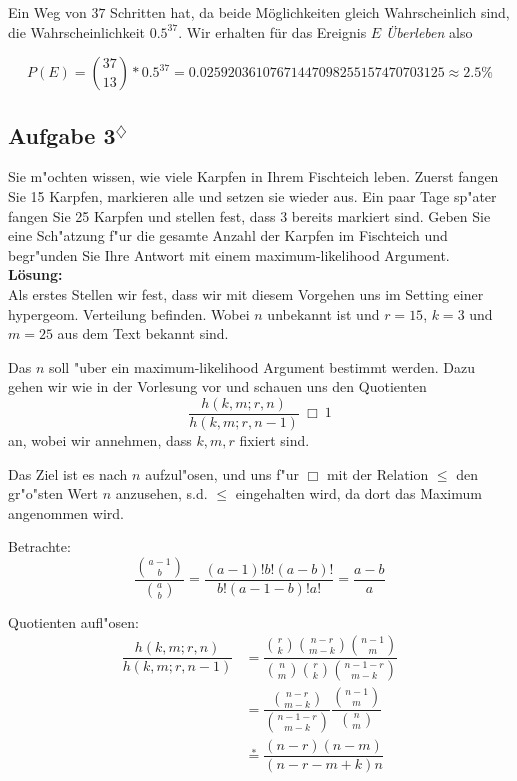 \documentclass[11pt,a4paper,ngerman]{article}
\newcommand{\marcel}{$^\diamondsuit$}
\begin{document}
Ein Weg von $37$ Schritten hat, da beide Möglichkeiten gleich Wahrscheinlich sind, die Wahrscheinlichkeit $0.5^{37}$. Wir erhalten für
das Ereignis $E$ \emph{Überleben} also

\[
    P(E) = \binom{37}{13} * 0.5^{37} = 0.02592036107671447098255157470703125 \approx 2.5\%
\]

\subsection*{Aufgabe 3\marcel}

Sie m"ochten wissen, wie viele Karpfen in Ihrem Fischteich leben. Zuerst fangen
Sie 15 Karpfen, markieren alle und setzen sie wieder aus. Ein paar Tage sp"ater
fangen Sie 25 Karpfen und stellen fest, dass 3 bereits markiert sind. Geben Sie
eine Sch"atzung f"ur die gesamte Anzahl der Karpfen im Fischteich und begr"unden
Sie Ihre Antwort mit einem maximum-likelihood Argument. \\

\textbf{Lösung:}\\

Als erstes Stellen wir fest, dass wir mit diesem Vorgehen uns im Setting einer
hypergeom. Verteilung befinden. Wobei $n$ unbekannt ist und $r = 15$, $k=3$ und
$m = 25$ aus dem Text bekannt sind.

Das $n$ soll "uber ein maximum-likelihood Argument bestimmt werden. Dazu gehen
wir wie in der Vorlesung vor und schauen uns den Quotienten \[
  \dfrac{h(k,m;r,n)}{h(k,m;r,n-1)}\ \Box\ 1
\] an, wobei wir annehmen, dass $k,m,r$ fixiert sind.

Das Ziel ist es nach $n$ aufzul"osen, und uns f"ur $\Box$ mit der Relation $\le$
den gr"o"sten Wert $n$ anzusehen, s.d. $\le$ eingehalten wird, da dort das
Maximum angenommen wird.

Betrachte: \[
  \dfrac{\binom{a-1}{b}}{\binom{a}{b}} = \dfrac{(a-1)! b! (a-b)!}{b! (a-1-b)! a!}
  = \dfrac{a-b}{a} \tag*{*}
\]

Quotienten aufl"osen:
\begin{align}
  \dfrac{h(k,m;r,n)}{h(k,m;r,n-1)}
  &=
    \dfrac{
      \binom{r}{k}\binom{n-r}{m-k}\binom{n-1}{m}
    }{
      \binom{n}{m}\binom{r}{k}\binom{n-1-r}{m-k}
    } \\
  &=
    \dfrac{
      \binom{n-r}{m-k}
    }{
      \binom{n-1-r}{m-k}
    }
    \dfrac{
      \binom{n-1}{m}
    }{
      \binom{n}{m}
    } \\
  &\stackrel{*}{=}
    \dfrac{(n-r)(n-m)}{(n-r-m+k)n}
\end{align}
\end{document}
